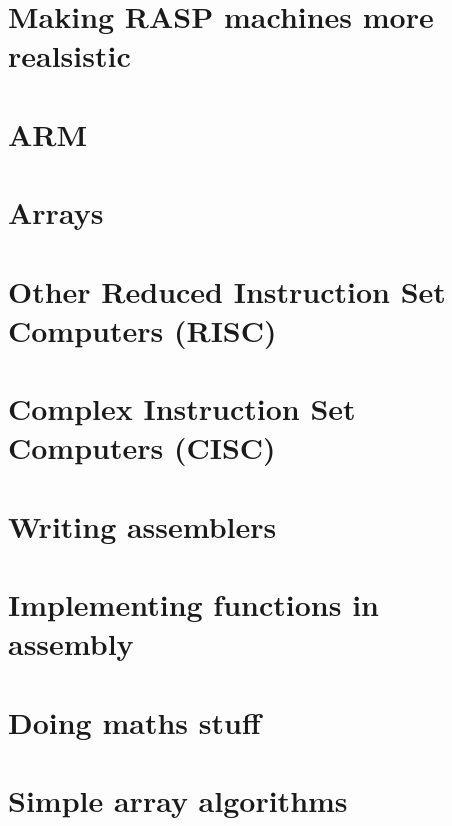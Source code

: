 \documentclass[oneside]{book}
\begin{document}
\part{Making RASP machines more realsistic}




\part{ARM}









\part{Arrays}


\part{Other Reduced Instruction Set Computers (RISC)}








\part{Complex Instruction Set Computers (CISC)}







\part{Writing assemblers}


\part{Implementing functions in assembly}


\part{Doing maths stuff}




\part{Simple array algorithms}





\end{document}
